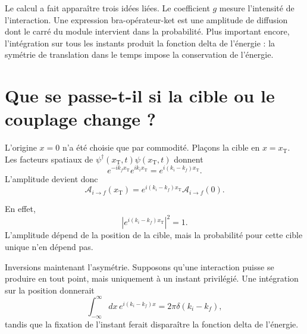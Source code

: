Le calcul a fait apparaître trois idées liées. Le coefficient \(g\) mesure l’intensité de l’interaction. Une expression bra-opérateur-ket est une amplitude de diffusion dont le carré du module intervient dans la probabilité. Plus important encore, l’intégration sur tous les instants produit la fonction delta de l’énergie : la symétrie de translation dans le temps impose la conservation de l’énergie.

\section{Que se passe-t-il si la cible ou le couplage change ?}

L’origine \(x=0\) n’a été choisie que par commodité. Plaçons la cible en \(x=x_{\mathrm T}\). Les facteurs spatiaux de \(\psi^\dagger(x_{\mathrm T},t)\psi(x_{\mathrm T},t)\) donnent
\begin{equation}
e^{-ik_f x_{\mathrm T}}e^{ik_i x_{\mathrm T}}
=e^{i(k_i-k_f)x_{\mathrm T}}.
\end{equation}
L’amplitude devient donc
\begin{equation}
\mathcal A_{i\to f}(x_{\mathrm T})
=e^{i(k_i-k_f)x_{\mathrm T}}
\mathcal A_{i\to f}(0).
\end{equation}

\begin{classroomqa}\end{classroomqa}

En effet,
\begin{equation}
\left|e^{i(k_i-k_f)x_{\mathrm T}}\right|^2=1.
\end{equation}
L’amplitude dépend de la position de la cible, mais la probabilité pour cette cible unique n’en dépend pas.

Inversions maintenant l’asymétrie. Supposons qu’une interaction puisse se produire en tout point, mais uniquement à un instant privilégié. Une intégration sur la position donnerait
\begin{equation}
\int_{-\infty}^{\infty}dx\,
e^{i(k_i-k_f)x}
=2\pi\delta(k_i-k_f),
\end{equation}
tandis que la fixation de l’instant ferait disparaître la fonction delta de l’énergie.

